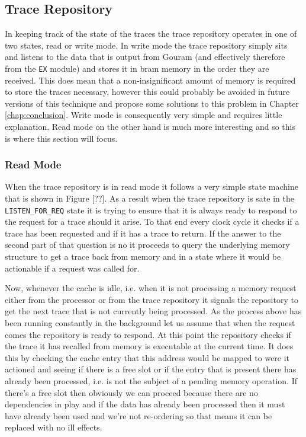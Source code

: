 \subsection{Trace Repository}

In keeping track of the state of the traces the trace repository operates in one of two states, read or write mode. In write mode the trace repository simply sits and listens to the data that is output from Gouram (and effectively therefore from the \texttt{EX} module) and stores it in \gls{bram} memory in the order they are received. This does mean that a non-insignificant amount of memory is required to store the traces necessary, however this could probably be avoided in future versions of this technique and propose some solutions to this problem in Chapter \ref{chap:conclusion}. Write mode is consequently very simple and requires little explanation. Read mode on the other hand is much more interesting and so this is where this section will focus.

\subsubsection{Read Mode}
\label{subsec:read-mode}

When the trace repository is in read mode it follows a very simple state machine that is shown in Figure [??]. As a result when the trace repository is sate in the \texttt{LISTEN\_FOR\_REQ} state it is trying to ensure that it is always ready to respond to the request for a trace should it arise. To that end every clock cycle it checks if a trace has been requested and if it has a trace to return. If the answer to the second part of that question is no it proceeds to query the underlying memory structure to get a trace back from memory and in a state where it would be actionable if a request was called for. 

Now, whenever the cache is idle, i.e. when it is not processing a memory request either from the processor or from the trace repository it signals the repository to get the next trace that is not currently being processed. As the process above has been running constantly in the background let us assume that when the request comes the repository is ready to respond. At this point the repository checks if the trace it has recalled from memory is executable at the current time. It does this by checking the cache entry that this address would be mapped to were it actioned and seeing if there is a free slot or if the entry that is present there has already been processed, i.e. is not the subject of a pending memory operation. If there's a free slot then obviously we can proceed because there are no dependencies in play and if the data has already been processed then it must have already been used and we're not re-ordering so that means it can be replaced with no ill effects. 

